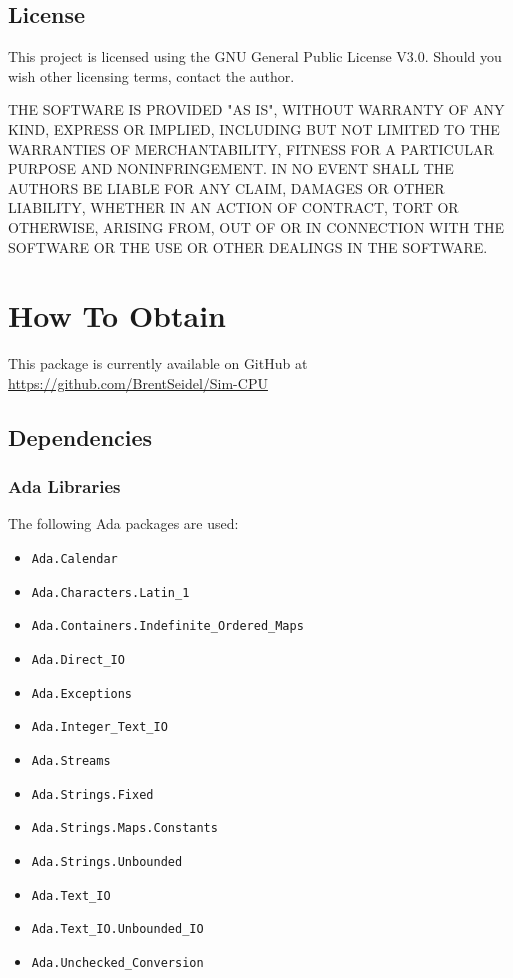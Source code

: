 \documentclass[10pt, openany]{book}
\newcommand{\package}[1]{\texttt{#1}}
\begin{document}
\section{License}
This project is licensed using the GNU General Public License V3.0.
Should you wish other licensing terms, contact the author.

THE SOFTWARE IS PROVIDED "AS IS", WITHOUT WARRANTY OF ANY KIND, EXPRESS OR IMPLIED, INCLUDING BUT NOT LIMITED TO THE WARRANTIES OF MERCHANTABILITY, FITNESS FOR A PARTICULAR PURPOSE AND NONINFRINGEMENT. IN NO EVENT SHALL THE AUTHORS BE LIABLE FOR ANY CLAIM, DAMAGES OR OTHER LIABILITY, WHETHER IN AN ACTION OF CONTRACT, TORT OR OTHERWISE, ARISING FROM, OUT OF OR IN CONNECTION WITH THE SOFTWARE OR THE USE OR OTHER DEALINGS IN THE SOFTWARE.

\chapter{How To Obtain}
This package is currently available on GitHub at \url{https://github.com/BrentSeidel/Sim-CPU}

\section{Dependencies}
\subsection{Ada Libraries}
The following Ada packages are used:
\begin{itemize}
  \item \package{Ada.Calendar}
  \item \package{Ada.Characters.Latin\_1}
  \item \package{Ada.Containers.Indefinite\_Ordered\_Maps}
  \item \package{Ada.Direct\_IO}
  \item \package{Ada.Exceptions}
  \item \package{Ada.Integer\_Text\_IO}
  \item \package{Ada.Streams}
  \item \package{Ada.Strings.Fixed}
  \item \package{Ada.Strings.Maps.Constants}
  \item \package{Ada.Strings.Unbounded}
  \item \package{Ada.Text\_IO}
  \item \package{Ada.Text\_IO.Unbounded\_IO}
  \item \package{Ada.Unchecked\_Conversion}
\end{itemize}
\end{document}
